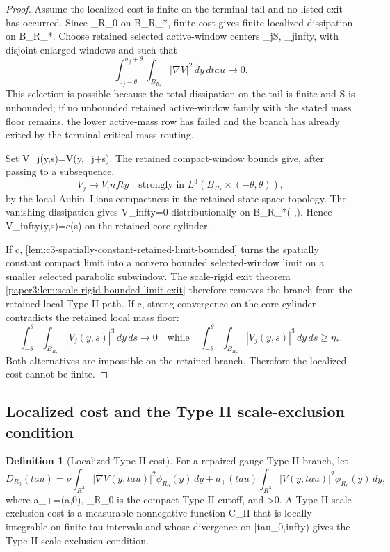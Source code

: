 \documentclass[11pt]{amsart}
\def\({}%
\def\){}%
\def\tilde#1{#1}%
\def\mathfrak#1{#1}%
\def\mathrm#1{#1}%
\def\mathbb#1{#1}%
\def\tau{tau}%
\def\infty{infty}%
\theoremstyle{plain}
\theoremstyle{definition}
\newtheorem{definition}[definition]{Definition}
\theoremstyle{remark}
\begin{document}
\begin{proof}
Assume the localized cost is finite on the terminal tail and no listed exit
has occurred.  Since \(\phi_{R_0}\) on \(B_{R_*}\), finite cost gives
finite localized dissipation on \(B_{R_*}\).  Choose retained selected
active-window centers \(\sigma_j\in\mathcal S\), \(\sigma_j\to\infty\), with
disjoint enlarged windows and such that
\[
  \int_{\sigma_j-\theta}^{\sigma_j+\theta}
  \int_{B_{R_*}}|\nabla V|^2\,dy\,d\tau\to0 .
\]
This selection is possible because the total dissipation on the tail is finite
and \(\mathcal S\) is unbounded; if no unbounded retained active-window family
with the stated mass floor remains, the lower active-mass row has failed and
the branch has already exited by the terminal critical-mass routing.
\par
Set \(V_j(y,s)=V(y,\sigma_j+s)\).  The retained compact-window bounds give,
after passing to a subsequence,
\[
  V_j\to V_\infty
  \quad\text{strongly in }L^3(B_{R_*}\times(-\theta,\theta)),
\]
by the local Aubin--Lions compactness in the retained state-space topology.
The vanishing dissipation gives
\(\nabla V_\infty=0\) distributionally on
\(B_{R_*}\times(-\theta,\theta)\).  Hence
\(V_\infty(y,s)=c(s)\) on the retained core cylinder.
\par
If \(c\not{}\), \cref{lem:c3-spatially-constant-retained-limit-bounded}
turns the spatially constant compact limit into a nonzero bounded
selected-window limit on a smaller selected parabolic subwindow.  The
scale-rigid exit theorem \cref{paper3:lem:scale-rigid-bounded-limit-exit}
therefore removes the branch from the retained local Type II path.  If
\(c\), strong convergence on the core cylinder contradicts the retained
local mass floor:
\[
  \int_{-\theta}^{\theta}\int_{B_{R_*}}|V_j(y,s)|^3\,dy\,ds\to0
  \quad\text{while}\quad
  \int_{-\theta}^{\theta}\int_{B_{R_*}}|V_j(y,s)|^3\,dy\,ds\ge\eta_* .
\]
Both alternatives are impossible on the retained branch.  Therefore the
localized cost cannot be finite.
\end{proof}

\subsection{Localized cost and the Type II scale-exclusion condition}

\begin{definition}[Localized Type II cost]
\label{def:c4-localized-cost}
For a repaired-gauge Type II branch, let
\[
  \tilde{\mathfrak D}_{R_0}(\tau)
  =
  \nu\int_{\mathbb R^3}|\nabla V(y,\tau)|^2\phi_{R_0}(y)\,dy
  +
  a_+(\tau)\int_{\mathbb R^3}|V(y,\tau)|^2\phi_{R_0}(y)\,dy,
\]
where \(a_+=\max(a,0)\), \(\phi_{R_0}\) is the compact Type II cutoff, and
\(\nu>0\).  A Type II scale-exclusion cost is a measurable nonnegative function
\(\mathfrak C_{\mathrm{II}}\) that is locally integrable on finite
\(\tau\)-intervals and whose divergence on \([\tau_0,\infty)\) gives the Type
II scale-exclusion condition.
\end{definition}
\end{document}

